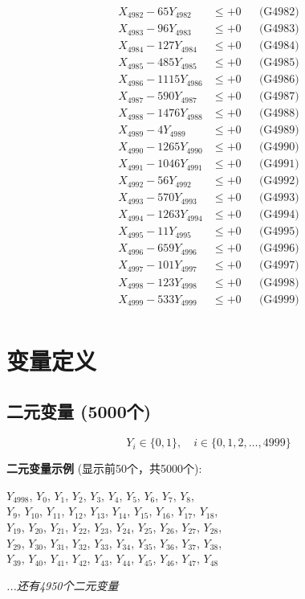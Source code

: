 \documentclass[a4paper,10pt]{article}
\begin{document}
{\begin{align}
X_{4982} - 65Y_{4982} &\leq +0 && \text{(G4982)} \\
X_{4983} - 96Y_{4983} &\leq +0 && \text{(G4983)} \\
X_{4984} - 127Y_{4984} &\leq +0 && \text{(G4984)} \\
X_{4985} - 485Y_{4985} &\leq +0 && \text{(G4985)} \\
X_{4986} - 1115Y_{4986} &\leq +0 && \text{(G4986)} \\
X_{4987} - 590Y_{4987} &\leq +0 && \text{(G4987)} \\
X_{4988} - 1476Y_{4988} &\leq +0 && \text{(G4988)} \\
X_{4989} - 4Y_{4989} &\leq +0 && \text{(G4989)} \\
X_{4990} - 1265Y_{4990} &\leq +0 && \text{(G4990)} \\
\allowbreak
X_{4991} - 1046Y_{4991} &\leq +0 && \text{(G4991)} \\
X_{4992} - 56Y_{4992} &\leq +0 && \text{(G4992)} \\
X_{4993} - 570Y_{4993} &\leq +0 && \text{(G4993)} \\
X_{4994} - 1263Y_{4994} &\leq +0 && \text{(G4994)} \\
X_{4995} - 11Y_{4995} &\leq +0 && \text{(G4995)} \\
X_{4996} - 659Y_{4996} &\leq +0 && \text{(G4996)} \\
X_{4997} - 101Y_{4997} &\leq +0 && \text{(G4997)} \\
X_{4998} - 123Y_{4998} &\leq +0 && \text{(G4998)} \\
X_{4999} - 533Y_{4999} &\leq +0 && \text{(G4999)} \\
\end{align}
}

\section{变量定义}

\subsection{二元变量 (5000个)}

\begin{equation}
Y_i \in \{0,1\}, \quad i \in \{0, 1, 2, \ldots, 4999\}
\end{equation}

\textbf{二元变量示例} (显示前50个，共5000个):

{\small
$Y_{4998}$, $Y_{0}$, $Y_{1}$, $Y_{2}$, $Y_{3}$, $Y_{4}$, $Y_{5}$, $Y_{6}$, $Y_{7}$, $Y_{8}$, \\
$Y_{9}$, $Y_{10}$, $Y_{11}$, $Y_{12}$, $Y_{13}$, $Y_{14}$, $Y_{15}$, $Y_{16}$, $Y_{17}$, $Y_{18}$, \\
$Y_{19}$, $Y_{20}$, $Y_{21}$, $Y_{22}$, $Y_{23}$, $Y_{24}$, $Y_{25}$, $Y_{26}$, $Y_{27}$, $Y_{28}$, \\
$Y_{29}$, $Y_{30}$, $Y_{31}$, $Y_{32}$, $Y_{33}$, $Y_{34}$, $Y_{35}$, $Y_{36}$, $Y_{37}$, $Y_{38}$, \\
$Y_{39}$, $Y_{40}$, $Y_{41}$, $Y_{42}$, $Y_{43}$, $Y_{44}$, $Y_{45}$, $Y_{46}$, $Y_{47}$, $Y_{48}$

\textit{...还有4950个二元变量}
}
\end{document}
